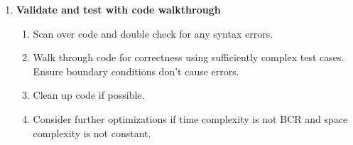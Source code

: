 \documentclass{article}
\begin{document}
\begin{enumerate}
     \item \textbf{Validate and test with code walkthrough}
    \begin{enumerate}
        \item Scan over code and double check for any syntax errors.
        \item Walk through code for correctness using sufficiently complex test cases. Ensure boundary conditions don't cause errors.
        \item Clean up code if possible.
        \item Consider further optimizations if time complexity is not BCR and space complexity is not constant.
    \end{enumerate}
\end{enumerate}

    
    
    
    

\end{document}
